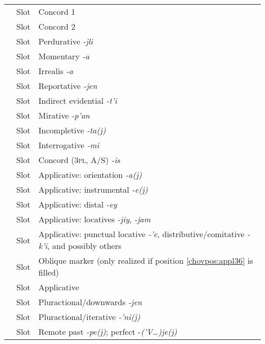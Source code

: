\documentclass[output=paper]{langscibook}
\begin{document}
\begin{longtable}{Slp{9cm}}
    \label{chovpos:concord19}     & Slot & Concord 1\\
    \label{chovpos:concord20}     & Slot & Concord 2\\
    \label{chovpos:perdurative21}     & Slot & Perdurative \textit{-jli}\\
    \label{chovpos:momentary22}     & Slot & Momentary \textit{-a}\\
    \label{chovpos:irrealis23}     & Slot & Irrealis \textit{-a}\\
    \label{chovpos:reportativejen24}     & Slot & Reportative \textit{-jen}\\
    \label{chovpos:indirectevidential25}     & Slot & Indirect evidential \textit{-t'i}\\
    \label{chovpos:mirative26}     & Slot & Mirative \textit{-p'an}\\
    \label{chovpos:incompletive27}     & Slot & Incompletive \textit{-ta(j)}\\
    \label{chovpos:interrogativemi28}     & Slot & Interrogative \textit{-mi}\\
    \label{chovpos:concord29}     & Slot & Concord (3\textsc{pl}, A/S) \textit{-is}\\
    \label{chovpos:applorientation30}     & Slot & Applicative: orientation \textit{-a(j)}\\
    \label{chovpos:applinstrumental31}     & Slot & Applicative: instrumental \textit{-e(j)}\\
    \label{chovpos:distaley32}     & Slot & Applicative: distal \textit{-ey}\\
    \label{chovpos:appllocative33}     & Slot & Applicative: locatives \textit{-jiy}, \textit{-jam}\\
    \label{chovpos:applipcntloc34}     & Slot & Applicative: punctual locative \textit{-'e}, distributive/comitative \textit{-k'i}, and possibly others\\
    \label{chovpos:oblique35}     & Slot & Oblique marker (only realized if position \ref{chovpos:appl36} is filled)\\
    \label{chovpos:appl36}     & Slot & Applicative\\
    \label{chovpos:pluractionaldownwards37}     & Slot & Pluractional/downwards \textit{-jen}\\
    \label{chovpos:pluractionaliterative38}     & Slot & Pluractional/iterative \textit{-'ni(j)}\\
    \label{chovpos:remotepastperfect39}     & Slot & Remote past \textit{-pe(j)}; perfect -\textit{('V…)je(j)}\\

\end{longtable}
\end{document}
